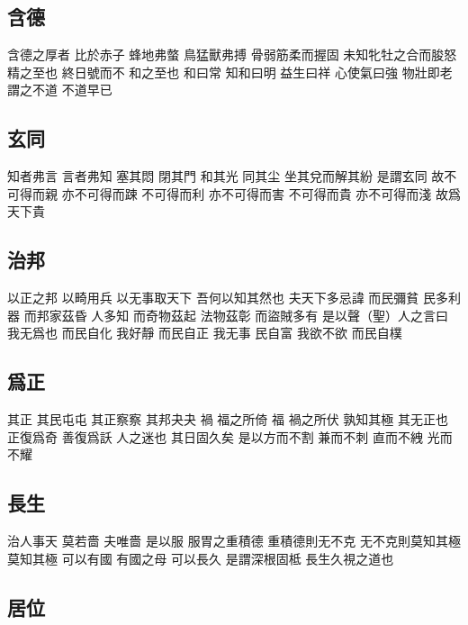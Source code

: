 \documentclass[a5paper,zihao=-4,oneside,UTF8]{ctexart}
\begin{document}
\subsection{含德}



含德之厚者 比於赤子 蜂地弗螫 鳥猛獸弗搏 骨弱筋柔而握固 未知牝牡之合而朘怒 精之至也 終日號而不 和之至也 
和曰常 知和曰明 益生曰祥 心使氣曰強 
物壯即老 謂之不道 不道早已 



\subsection{玄同}



知者弗言 言者弗知 
塞其悶 閉其門 和其光 同其尘 坐其兌而解其紛 是謂玄同 
故不可得而親 亦不可得而踈 不可得而利 亦不可得而害 不可得而貴 亦不可得而淺 故爲天下貴




\subsection{治邦}



以正之邦 以畸用兵 以无事取天下 吾何以知其然也  
夫天下多忌諱 而民彌貧 民多利器 而邦家茲昏 人多知 而奇物茲起 法物茲彰 而盜賊多有 
是以聲（聖）人之言曰 我无爲也 而民自化 我好靜 而民自正 我无事 民自富 我欲不欲 而民自樸 



\subsection{爲正}



其正 其民屯屯 其正察察 其邦夬夬 
禍 福之所倚 福 禍之所伏 孰知其極 
其无正也 正復爲奇 善復爲訞 
人之迷也 其日固久矣 
是以方而不割 兼而不刺 直而不絏 光而不耀 



\subsection{長生}



治人事天 莫若嗇 
夫唯嗇 是以服 服胃之重積德 重積德則无不克 无不克則莫知其極 莫知其極 可以有國 有國之母 可以長久 
是謂深根固柢 長生久視之道也 



\subsection{居位}
\end{document}
